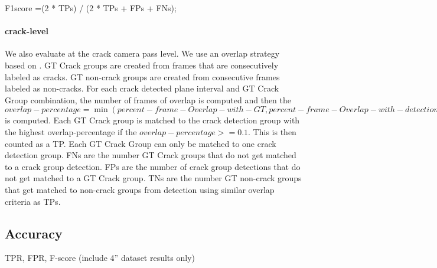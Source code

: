 F1score =(2 * TPs) / (2 * TPs + FPs + FNs);

\paragraph{crack-level}
     We also evaluate at the crack camera pass level. We use an overlap strategy based on \cite{HooverGoldgofpaper}.
     GT Crack groups are created from frames that are consecutively labeled as cracks. GT non-crack groups are created from consecutive frames labeled as non-cracks.  For each crack detected plane interval and GT Crack Group combination, the number of frames of overlap is computed and then the $overlap-percentage = \min( percent-frame-Overlap-with-GT, percent-frame-Overlap-with-detection)$ is computed.   Each GT Crack group is matched to the crack detection group with the highest overlap-percentage if the $overlap-percentage >= 0.1$. This is then counted as a TP.  Each GT Crack Group can only be matched to one crack detection group. 
FNs are the number GT Crack groups that do not get matched to a crack group detection. 
FPs are the number of crack group detections that do not get matched to a GT Crack group.
TNs are the number GT non-crack groups that get matched to non-crack groups from detection using similar overlap criteria as TPs. 



\subsection{Accuracy}
TPR, FPR, F-score (include 4” dataset results only)
